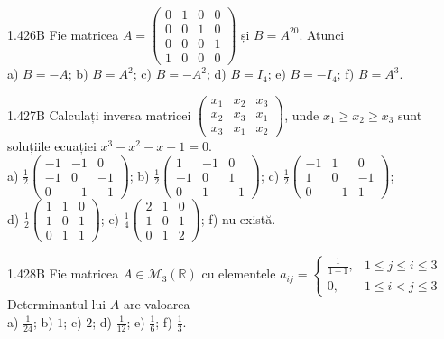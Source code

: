 \documentclass[11pt]{article}
\begin{document}
1.426B Fie matricea $A=\left(\begin{array}{llll}0 & 1 & 0 & 0 \\ 0 & 0 & 1 & 0 \\ 0 & 0 & 0 & 1 \\ 1 & 0 & 0 & 0\end{array}\right)$ și $B=A^{20}$. Atunci\\ a) $B=-A$; b) $B=A^{2}$; c) $B=-A^{2}$; d) $B=I_{4}$; e) $B=-I_{4}$; f) $B=A^{3}$.

1.427B Calculați inversa matricei $\left(\begin{array}{lll}x_{1} & x_{2} & x_{3} \\ x_{2} & x_{3} & x_{1} \\ x_{3} & x_{1} & x_{2}\end{array}\right)$, unde $x_{1} \geq x_{2} \geq x_{3}$ sunt soluțiile ecuației $x^{3}-x^{2}-x+1=0$.\\ a) $\frac{1}{2}\left(\begin{array}{ccc}-1 & -1 & 0 \\ -1 & 0 & -1 \\ 0 & -1 & -1\end{array}\right)$; b) $\frac{1}{2}\left(\begin{array}{ccc}1 & -1 & 0 \\ -1 & 0 & 1 \\ 0 & 1 & -1\end{array}\right)$; c) $\frac{1}{2}\left(\begin{array}{ccc}-1 & 1 & 0 \\ 1 & 0 & -1 \\ 0 & -1 & 1\end{array}\right)$;\\ d) $\frac{1}{2}\left(\begin{array}{lll}1 & 1 & 0 \\ 1 & 0 & 1 \\ 0 & 1 & 1\end{array}\right)$; e) $\frac{1}{4}\left(\begin{array}{lll}2 & 1 & 0 \\ 1 & 0 & 1 \\ 0 & 1 & 2\end{array}\right)$; f) nu există.

1.428B Fie matricea $A \in \mathcal{M}_{3}(\mathbb{R})$ cu elementele $a_{i j}= \begin{cases}\frac{1}{1+1}, & 1 \leq j \leq i \leq 3 \\ 0, & 1 \leq i<j \leq 3\end{cases}$\\ Determinantul lui $A$ are valoarea\\ a) $\frac{1}{24}$; b) $1$; c) $2$; d) $\frac{1}{12}$; e) $\frac{1}{6}$; f) $\frac{1}{3}$.
\end{document}
